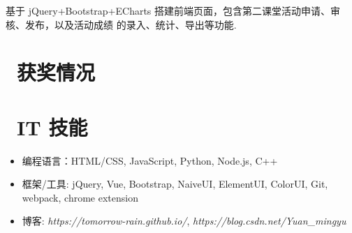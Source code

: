 \documentclass{resume}
\begin{document}
\begin{onehalfspacing}
基于 jQuery+Bootstrap+ECharts 搭建前端页面，包含第二课堂活动申请、审核、发布，以及活动成绩
的录入、统计、导出等功能.
\end{onehalfspacing}

\section{\faHeartO\ 获奖情况}

\section{\faCogs\ IT 技能}
\begin{itemize}[parsep=0.5ex]
  \item 编程语言：HTML/CSS, JavaScript, Python, Node.js, C++
  \item 框架/工具: jQuery, Vue, Bootstrap, NaiveUI, ElementUI, ColorUI, Git, webpack, chrome extension
  \item 博客: \textit{https://tomorrow-rain.github.io/}, \textit{https://blog.csdn.net/Yuan\_mingyu}
\end{itemize}


%
%
\end{document}
